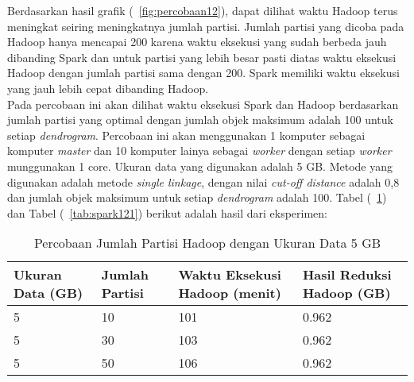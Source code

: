 Berdasarkan hasil grafik (~\ref{fig:percobaan12}), dapat dilihat waktu Hadoop terus meningkat seiring meningkatnya jumlah partisi. Jumlah partisi yang dicoba pada Hadoop hanya mencapai 200 karena waktu eksekusi yang sudah berbeda jauh dibanding Spark dan untuk partisi yang lebih besar pasti diatas waktu eksekusi Hadoop dengan jumlah partisi sama dengan 200. Spark memiliki waktu eksekusi yang jauh lebih cepat dibanding Hadoop. \\















Pada percobaan ini akan dilihat waktu eksekusi Spark dan Hadoop berdasarkan jumlah partisi yang optimal dengan jumlah objek maksimum adalah 100 untuk setiap \textit{dendrogram}. Percobaan ini akan menggunakan 1 komputer sebagai komputer \textit{master} dan 10 komputer lainya sebagai \textit{worker} dengan setiap \textit{worker} munggunakan 1 core. Ukuran data yang digunakan adalah 5 GB. Metode yang digunakan adalah metode \textit{single linkage}, dengan nilai \textit{cut-off distance} adalah 0,8 dan jumlah objek maksimum untuk setiap \textit{dendrogram} adalah 100. Tabel (~\ref{tab:spark111}) dan Tabel (~\ref{tab:spark121}) berikut adalah hasil dari eksperimen:





\begin{table}[H] 
	\centering 
	\caption{Percobaan Jumlah Partisi Hadoop dengan Ukuran Data 5 GB}
	\label{tab:spark111}
	\begin{tabular}{|p{3cm}|p{3cm}|p{4cm}|p{4cm}|}
\hline
Ukuran Data (GB) & Jumlah Partisi &  Waktu Eksekusi Hadoop (menit) & Hasil Reduksi Hadoop (GB)\\
\hline
5 & 10 & 101  & 0.962  \\
\hline
5 & 30 & 103  & 0.962  \\
\hline
5 & 50 & 106  & 0.962   \\
\hline


\hline

	\end{tabular} 
\end{table}






